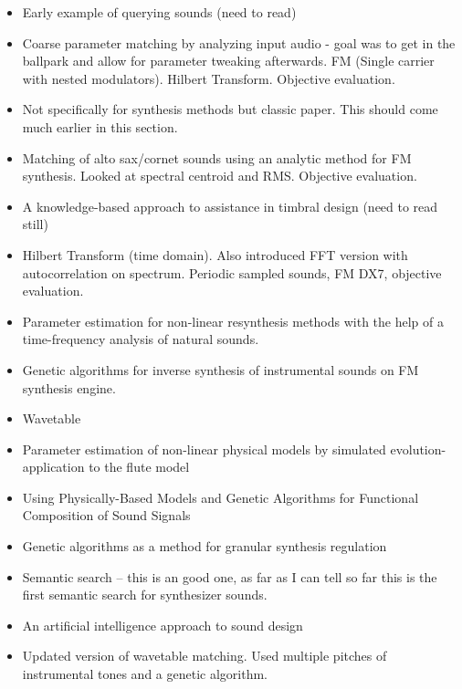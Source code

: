 \begin{itemize}
	\item \cite{zloof1977query} Early example of querying sounds (need to read)
	\item \cite{justice1979analytic} Coarse parameter matching by analyzing input audio - goal was to get in the ballpark and allow for parameter tweaking afterwards. FM (Single carrier with nested modulators). Hilbert Transform. Objective evaluation.
	\item \cite{wessel1979timbre} Not specifically for synthesis methods but classic paper. This should come much earlier in this section.
	\item \cite{beauchamp1982synthesis} Matching of alto sax/cornet sounds using an analytic method for FM synthesis. Looked at spectral centroid and RMS. Objective evaluation.
	\item \cite{ashley1986knowledge} A knowledge-based approach to assistance in timbral design (need to read still)
	\item \cite{payne1987microcomputer} Hilbert Transform (time domain). Also introduced FFT version with autocorrelation on spectrum. Periodic sampled sounds, FM DX7, objective evaluation.
	\item \cite{delprat1990parameter} Parameter estimation for non-linear resynthesis methods with the help of a time-frequency analysis of natural sounds.
	\item \cite{horner1993machine} Genetic algorithms for inverse synthesis of instrumental sounds on FM synthesis engine.
	\item \cite{horner1993methods} Wavetable
	\item \cite{vuori1993parameter} Parameter estimation of non-linear physical models by simulated evolution-application to the flute model
	\item \cite{takala1993using} Using Physically-Based Models and Genetic Algorithms for Functional Composition of Sound Signals
	\item \cite{fujinaga1994genetic} Genetic algorithms as a method for granular synthesis regulation
	\item \cite{ethington1994seawave} Semantic search -- this is an good one, as far as I can tell so far this is the first semantic search for synthesizer sounds.
	\item \cite{miranda1995artificial} An artificial intelligence approach to sound design
	\item \cite{horner1995wavetable} Updated version of wavetable matching. Used multiple pitches of instrumental tones and a genetic algorithm.

\end{itemize}
